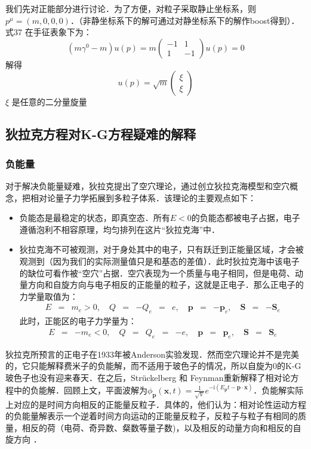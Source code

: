 我们先对正能部分进行讨论．为了方便，对粒子采取静止坐标系，则 $p^\mu=(m,0,0,0)$．（非静坐标系下的解可通过对静坐标系下的解作boost得到）．式37 在手征表象下为：
\begin{equation}
\left(m \gamma^{0}-m\right) u\left(p\right)=m\left(\begin{array}{rr}
-1 & 1 \\
1 & -1
\end{array}\right) u\left(p\right)=0
\end{equation}
解得\begin{equation}\label{qed4_eq25}
u\left(p\right)=\sqrt{m}\left(\begin{array}{l}
\xi \\
\xi
\end{array}\right)
\end{equation}
$\xi$ 是任意的二分量旋量 
\subsection{狄拉克方程对K-G方程疑难的解释}
\subsubsection{负能量}
对于解决负能量疑难，狄拉克提出了空穴理论，通过创立狄拉克海模型和空穴概念，把相对论量子力学拓展到多粒子体系．该理论的主要观点如下：
\begin{itemize}
\item  负能态是最稳定的状态，即真空态．所有$E<0$的负能态都被电子占据，电子遵循泡利不相容原理，均匀排列在这片“狄拉克海”中．
\item 狄拉克海不可被观测，对于身处其中的电子，只有跃迁到正能量区域，才会被观测到（因为我们的实际测量值只是和基态的差值）．此时狄拉克海中该电子的缺位可看作被“空穴”占据．空穴表现为一个质量与电子相同，但是电荷、动量方向和自旋方向与电子相反的正能量的粒子，这就是正电子．那么正电子的力学量取值为：\begin{eqnarray}
E & = & m_{e}>0, \quad Q & = & -Q_{e} & = & e, \quad \boldsymbol{p} & = & -\boldsymbol{p}_{e},  \quad \boldsymbol S & = & -\boldsymbol{S}_{e}
\end{eqnarray}
此时，正能区的电子力学量为：
\begin{eqnarray}
E & = & -m_{e}<0, \quad Q & = & Q_{e} & = & -e, \quad \boldsymbol{p} & = & \boldsymbol{p}_{e}, \quad \boldsymbol S & = & \boldsymbol S_{e}
\end{eqnarray}

\end{itemize}
狄拉克所预言的正电子在1933年被Anderson实验发现．然而空穴理论并不是完美的，它只能解释费米子的负能解，而不适用于玻色子的情况，所以自旋为0的K-G玻色子也没有迎来春天．在之后，Strückelberg 和 Feynman重新解释了相对论方程中的负能解．回顾上文，平面波解为$\phi_{\boldsymbol{p}}(\boldsymbol{x}, t)=\frac{1}{\sqrt{V}} e^{-\mathrm{i}\left(E_{\boldsymbol{p}} t-\boldsymbol{p} \cdot \boldsymbol{x}\right)}$．负能解实际上对应的是时间方向相反的正能量反粒子．具体的，他们认为：相对论性运动方程的负能量解表示一个逆着时间方向运动的正能量反粒子，反粒子与粒子有相同的质量，相反的荷（电荷、奇异数、粲数等量子数)，以及相反的动量方向和相反的自旋方向
．
